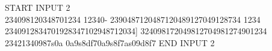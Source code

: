 
START INPUT 2 \\
234098120348701234 12340-
2390487120487120489127049128734 1234
2340912834701928347102948712034]
324098172049812704981274901234
23421340987s0a 0a9s8df70a9s8f7as09d8f7
END INPUT 2 \\